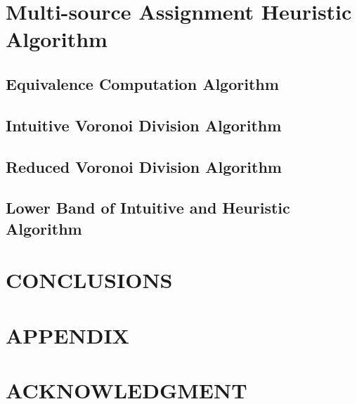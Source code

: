 \documentclass[letterpaper, 10 pt, conference]{ieeeconf}  %
\begin{document}


%

\section{Multi-source Assignment Heuristic Algorithm}

\subsection{Equivalence Computation Algorithm}


\subsection{Intuitive Voronoi Division Algorithm}


\subsection{Reduced Voronoi Division Algorithm}


\subsection{Lower Band of Intuitive and Heuristic Algorithm}


\section{CONCLUSIONS}

\addtolength{\textheight}{-12cm}   %







\section*{APPENDIX}

\section*{ACKNOWLEDGMENT}

\printbibliography
\end{document}
